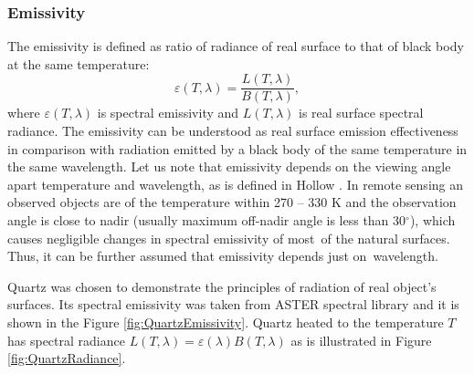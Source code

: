 \subsubsection*{Emissivity}
The emissivity is defined as ratio of radiance of real surface to that of black body at the same temperature:
$$ \varepsilon(T,\lambda) = \frac{L(T,\lambda)}{B(T,\lambda)},$$
where $\varepsilon(T,\lambda)$ is spectral emissivity and $L(T,\lambda)$ is real surface spectral radiance. The emissivity can be understood as real surface emission effectiveness in comparison with radiation emitted by a black body of the same temperature in the same wavelength. Let us note that emissivity depends on the viewing angle apart temperature and wavelength, as is defined in Hollow \cite{H11}. In remote sensing an observed objects are of the temperature within 270 – 330 K and the observation angle is close to nadir (usually maximum off-nadir angle is less than 30$^\circ$), which causes negligible changes in spectral emissivity of most~of the natural surfaces. Thus, it can be further assumed that emissivity depends just on~wavelength. 

Quartz was chosen to demonstrate the principles of radiation of real object's surfaces. Its spectral emissivity was taken from ASTER spectral library \cite{BH09} and it is shown in the Figure \ref{fig:QuartzEmissivity}. Quartz heated to the temperature $T$ has spectral radiance $L(T,\lambda) = \varepsilon(\lambda) B(T,\lambda)$ as is illustrated in Figure \ref{fig:QuartzRadiance}. 

